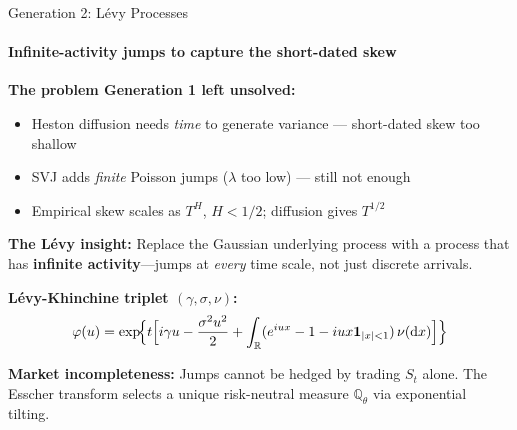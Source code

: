\documentclass[aspectratio=169]{beamer}
\begin{document}
\begin{frame}{Generation 2: L\'evy Processes}
\framesubtitle{Infinite-activity jumps to capture the short-dated skew}

\textbf{The problem Generation 1 left unsolved:}
\begin{itemize}
    \item Heston diffusion needs \emph{time} to generate variance --- short-dated skew too shallow
    \item SVJ adds \emph{finite} Poisson jumps ($\lambda$ too low) --- still not enough
    \item Empirical skew scales as $T^H$, $H < 1/2$; diffusion gives $T^{1/2}$
\end{itemize}

\vspace{0.2cm}
\textcolor{bbgorange}{\textbf{The Lévy insight:}} Replace the Gaussian underlying process with a process that has \textbf{infinite activity}---jumps at \emph{every} time scale, not just discrete arrivals.

\vspace{0.2cm}
\textbf{L\'evy-Khinchine triplet $(\gamma, \sigma, \nu)$:}
\begin{equation}
\varphi(u) = \exp\!\Bigl\{t\Bigl[i\gamma u - \frac{\sigma^2 u^2}{2} + \int_{\mathbb{R}}(e^{iux}-1-iux\mathbf{1}_{|x|<1})\,\nu(\mathrm{d}x)\Bigr]\Bigr\}
\end{equation}

\vspace{0.2cm}
\textbf{Market incompleteness:} Jumps cannot be hedged by trading $S_t$ alone. The Esscher transform selects a unique risk-neutral measure $\mathbb{Q}_\theta$ via exponential tilting.

\end{frame}

\end{document}
